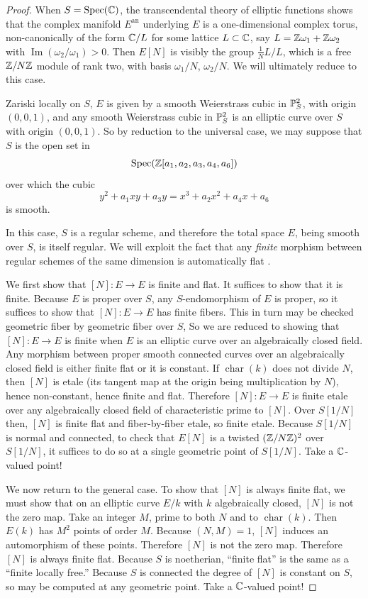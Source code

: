 \begin{proof}
When $S = \operatorname{Spec}(\mathbb{C})$, the transcendental theory of elliptic functions shows that the complex manifold $E^{\mathrm{an}}$ underlying $E$ is a one-dimensional complex torus, non-canonically of the form $\mathbb{C}/L$ for some lattice $L \subset \mathbb{C}$, say $L = \mathbb{Z}\omega_1 + \mathbb{Z}\omega_2$ with $\operatorname{Im}(\omega_2/\omega_1) > 0$. Then $E[N]$ is visibly the group $\frac{1}{N}L/L$, which is a free $\mathbb{Z}/N\mathbb{Z}$ module of rank two, with basis $\omega_1/N$, $\omega_2/N$. We will ultimately reduce to this case.

Zariski locally on $S$, $E$ is given by a smooth Weierstrass cubic in $\mathbb{P}^2_S$, with origin $(0, 0, 1)$, and any smooth Weierstrass cubic in $\mathbb{P}^2_S$ is an elliptic curve over $S$ with origin $(0, 0, 1)$. So by reduction to the universal case, we may suppose that $S$ is the open set in
\[
\operatorname{Spec}(\mathbb{Z}[a_1, a_2, a_3, a_4, a_6])
\]
over which the cubic
\[
y^2 + a_1 xy + a_3 y = x^3 + a_2 x^2 + a_4 x + a_6
\]
is smooth.

In this case, $S$ is a regular scheme, and therefore the total space $E$, being smooth over $S$, is itself regular. We will exploit the fact that any \emph{finite} morphism between regular schemes of the same dimension is automatically flat \cite[V, 3.6]{AK1}.

We first show that $[N] : E \to E$ is finite and flat. It suffices to show that it is finite. Because $E$ is proper over $S$, any $S$-endomorphism of $E$ is proper, so it suffices to show that $[N] : E \to E$ has finite fibers. This in turn may be checked geometric fiber by geometric fiber over $S$, So we are reduced to showing that $[N] : E \to E$ is finite when $E$ is an elliptic curve over an algebraically closed field. Any morphism between proper smooth connected curves over an algebraically closed field is either finite flat or it is constant. If $\operatorname{char}(k)$ does not divide $N$, then $[N]$ is etale (its tangent map at the origin being multiplication by $N$), hence non-constant, hence finite and flat. Therefore $[N] : E \to E$ is finite etale over any algebraically closed field of characteristic prime to $[N]$. Over $S[1/N]$ then, $[N]$ is finite flat and fiber-by-fiber etale, so finite etale. Because $S[1/N]$ is normal and connected, to check that $E[N]$ is a twisted $(\mathbb{Z}/N\mathbb{Z})^2$ over $S[1/N]$, it suffices to do so at a single geometric point of $S[1/N]$. Take a $\mathbb{C}$-valued point!

We now return to the general case. To show that $[N]$ is always finite flat, we must show that on an elliptic curve $E/k$ with $k$ algebraically closed, $[N]$ is not the zero map. Take an integer $M$, prime to both $N$ and to $\operatorname{char}(k)$. Then $E(k)$ has $M^2$ points of order $M$. Because $(N, M) = 1$, $[N]$ induces an automorphism of these points. Therefore $[N]$ is not the zero map. Therefore $[N]$ is always finite flat. Because $S$ is noetherian, ``finite flat'' is the same as a ``finite locally free.'' Because $S$ is connected the degree of $[N]$ is constant on $S$, so may be computed at any geometric point. Take a $\mathbb{C}$-valued point!
\end{proof}

